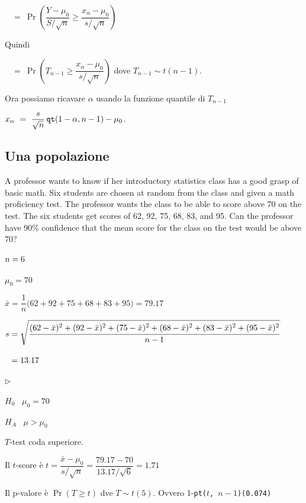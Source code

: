 \documentclass[11pt,openany]{book}
\newcommand{\mylabel}[1]{{\footnotesize\textsf{#1}}\hfill}
\renewenvironment{itemize}
  {\begin{list}{$\triangleright$}{%
   \setlength{\parskip}{0mm}
   \setlength{\topsep}{.2\baselineskip}
   \setlength{\rightmargin}{0mm}
   \setlength{\listparindent}{0mm}
   \setlength{\itemindent}{0mm}
   \setlength{\labelwidth}{3ex}
   \setlength{\itemsep}{.4\baselineskip}
   \setlength{\parsep}{0mm}
   \setlength{\partopsep}{0mm}
   \setlength{\labelsep}{1ex}
   \setlength{\leftmargin}{\labelwidth+\labelsep}
   \let\makelabel\mylabel}}{%
   \end{list}\vspace*{-1.3mm}}
\begin{document}
$\phantom{\alpha}\ =\ \Pr\left(\dfrac{Y-\mu_0}{S/\sqrt{n}}\ge \dfrac{x_\alpha-\mu_0}{s/\sqrt{n}}\right)$\medskip

Quindi\medskip

$\phantom{\alpha}\ =\ \Pr\left(T_{n-1}\ge \dfrac{x_\alpha-\mu_0}{s/\sqrt{n}}\right)$ dove $T_{n-1}\sim t(n-1)$.

Ora possiamo ricavare $\alpha$ usando la funzione quantile di $T_{n-1}$\medskip

\hfill $x_\alpha\ =\ \dfrac{s}{\sqrt n}\,{\tt qt}(1-\alpha,n-1)-\mu_0$.



\subsection{Una popolazione}
A professor wants to know if her introductory statistics class has a good grasp of basic math. Six students are chosen at random from the class and given a math proficiency test. The professor wants the class to be able to score above 70 on the test. The six students get scores of 62, 92, 75, 68, 83, and 95. Can the professor have 90\%  confidence that the mean score for the class on the test would be above 70?

$\strut n=6$

$\mu_0=70$

$\bar x =\dfrac1n\big(62+92+75+68+83+95\big) =79.17$

$s = \sqrt{\dfrac{\strut(62-\bar x)^2+(92-\bar x)^2+(75-\bar x)^2+(68-\bar x)^2+(83-\bar x)^2+(95-\bar x)^2}{n-1}}$

$\strut\phantom{s} = 13.17$

\begin{itemize}
\item[1.] $H_0$ \ $\mu_0 = 70$

\item[2.] $H_A$ \ $\mu>\mu_0$

\item[3.] $T$-test coda superiore. 

\item[4.] Il $t$-score è 
$t = \dfrac{\bar x - \mu_0}{s/\sqrt{n}}=\dfrac{79.17-70}{13.17/\sqrt{6}} = 1.71$

\item[5.] Il p-valore è $\Pr(T\ge t)$ dve $T\sim t(5)$. Ovvero 1-{\tt pt($t$, $n-1$)}\hfill{\tt (0.074)}
\end{itemize}

\end{document}
